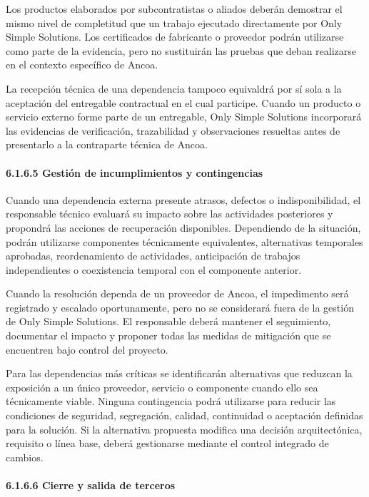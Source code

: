 \documentclass[11pt]{article}
\begin{document}
Los productos elaborados por subcontratistas o aliados deberán demostrar
el mismo nivel de completitud que un trabajo ejecutado directamente por
Only Simple Solutions. Los certificados de fabricante o proveedor podrán
utilizarse como parte de la evidencia, pero no sustituirán las pruebas
que deban realizarse en el contexto específico de Ancoa.

La recepción técnica de una dependencia tampoco equivaldrá por sí sola a
la aceptación del entregable contractual en el cual participe. Cuando un
producto o servicio externo forme parte de un entregable, Only Simple
Solutions incorporará las evidencias de verificación, trazabilidad y
observaciones resueltas antes de presentarlo a la contraparte técnica de
Ancoa.

\paragraph{6.1.6.5 Gestión de incumplimientos y contingencias}\label{6-1-6-5-gestion-de-incumplimientos-y-contingencias}

Cuando una dependencia externa presente atrasos, defectos o indisponibilidad, el responsable técnico evaluará su impacto sobre las actividades posteriores y propondrá las acciones de recuperación disponibles. Dependiendo de la situación, podrán utilizarse componentes técnicamente equivalentes, alternativas temporales aprobadas, reordenamiento de actividades, anticipación de trabajos independientes o coexistencia temporal con el componente anterior.

Cuando la resolución dependa de un proveedor de Ancoa, el impedimento
será registrado y escalado oportunamente, pero no se considerará fuera
de la gestión de Only Simple Solutions. El responsable deberá mantener
el seguimiento, documentar el impacto y proponer todas las medidas de
mitigación que se encuentren bajo control del proyecto.

Para las dependencias más críticas se identificarán alternativas que
reduzcan la exposición a un único proveedor, servicio o componente
cuando ello sea técnicamente viable. Ninguna contingencia podrá
utilizarse para reducir las condiciones de seguridad, segregación,
calidad, continuidad o aceptación definidas para la solución. Si la
alternativa propuesta modifica una decisión arquitectónica, requisito o
línea base, deberá gestionarse mediante el control integrado de cambios.

\paragraph{6.1.6.6 Cierre y salida de terceros}\label{6-1-6-6-cierre-y-salida-de-terceros}
\end{document}

